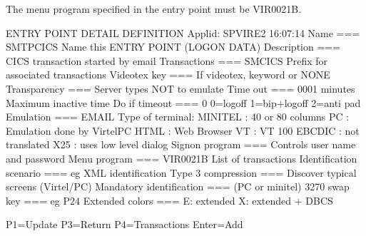 \documentclass[letterpaper,10pt,english]{sphinxmanual}
\begin{document}
The menu program specified in the entry point must be VIR0021B.

\begin{sphinxVerbatim}[commandchars=\\\{\}]
ENTRY POINT DETAIL DEFINITION \PYGZhy{}\PYGZhy{}\PYGZhy{}\PYGZhy{}\PYGZhy{}\PYGZhy{}\PYGZhy{}\PYGZhy{}\PYGZhy{}\PYGZhy{}\PYGZhy{}\PYGZhy{}\PYGZhy{}\PYGZhy{}\PYGZhy{}\PYGZhy{}\PYGZhy{}\PYGZhy{}\PYGZhy{}\PYGZhy{}\PYGZhy{}\PYGZhy{} Applid: SPVIRE2 16:07:14
Name          ===\PYGZgt{} SMTPCICS            Name this ENTRY POINT (LOGON DATA)
Description   ===\PYGZgt{} CICS transaction started by email
Transactions  ===\PYGZgt{} SMCICS              Prefix for associated transactions
Videotex key  ===\PYGZgt{}                     If videotex, keyword or \PYGZdl{}NONE\PYGZdl{}
Transparency  ===\PYGZgt{}                     Server types NOT to emulate
Time out      ===\PYGZgt{} 0001   minutes      Maximum inactive time
Do if timeout ===\PYGZgt{} 0                   0=logoff 1=bip+logoff 2=anti pad
Emulation     ===\PYGZgt{} EMAIL               Type of terminal:
MINITEL : 40 or 80 columns             PC  : Emulation done by VirtelPC
HTML    : Web Browser                  VT  : VT 100
EBCDIC  : not translated               X25 : uses low level dialog
Signon program           ===\PYGZgt{}          Controls user name and password
Menu program             ===\PYGZgt{} VIR0021B  List of transactions
Identification scenario  ===\PYGZgt{}          eg XML identification
Type 3 compression       ===\PYGZgt{}          Discover typical screens (Virtel/PC)
Mandatory identification ===\PYGZgt{}                               (PC or minitel)
3270 swap key            ===\PYGZgt{}          eg P24
Extended colors          ===\PYGZgt{}          E: extended X: extended + DBCS

P1=Update                       P3=Return                  P4=Transactions
Enter=Add
\end{sphinxVerbatim}

\end{document}
